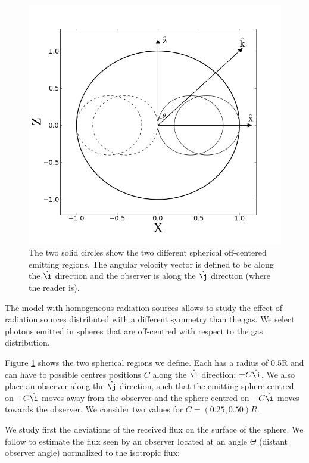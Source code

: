 \documentclass{emulateapj}
\begin{document}
\begin{figure}
  \includegraphics[scale=0.3]{OF_spheres.png}
  \caption{The two solid circles show the two different spherical off-centered emitting
    regions. The angular velocity vector is defined to be along the
    $\hat{\i}$ direction and the observer is along the $\hat{\j}$ direction (where
    the reader is). 
    \label{fig:OCspheres}} 
\end{figure}

The model with homogeneous radiation sources allows to study the
effect of radiation sources distributed with a different symmetry than
the gas. We select photons emitted in spheres that are off-centred
with respect to the gas distribution. 

Figure \ref{fig:OCspheres} shows the 
two spherical regions we define. Each has a radius of $0.5$R and can
have to possible centres positions $C$ along the $\hat{\i}$ direction:
$\pm C\hat{\i}$. We also place an observer along the $\hat{\j}$
direction, such that the emitting sphere centred on $+C\hat{\i}$ moves away
from the observer and the sphere centred on $+C\hat{\i}$ moves towards
the observer. We consider two values for $C=(0.25,0.50)R$.

We study first the deviations of the received flux on the surface of the
sphere. We follow \cite{Zheng2013} to estimate the flux seen by an
observer located at an angle $\Theta$ (distant observer angle)
normalized to the isotropic flux:
\end{document}
